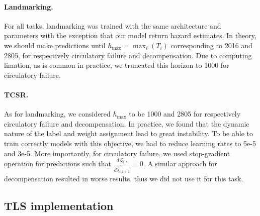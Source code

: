\documentclass[nohyperref]{article}
\begin{document}
\paragraph{Landmarking.} For all tasks, landmarking was trained with the same architecture and parameters with the exception that our model return hazard estimates. In theory, we should make predictions until $h_{\max} = \max_{i}( T_i)$ corresponding to 2016 and 2805, for respectively circulatory failure and decompensation. Due to computing limation, as is common in practice, we truncated this horizon to 1000 for circulatory failure.


\paragraph{TCSR.}
As for landmarking, we considered $h_{\max}$ to be 1000 and 2805 for respectively circulatory failure and decompensation. In practice, we found that the dynamic nature of the label and weight assignment lead to great instability. To be able to train correctly models with this objective, we had to reduce learning rates to 5e-5 and 3e-5. More importantly, for circulatory failure, we used stop-gradient operation for predictions such that $\frac{d\mathcal{L}_{i,t}}{d\hat{\lambda}^h_{i,t+1}} = 0$. A similar approach for decompensation resulted in worse results, thus we did not use it for this task.

\subsection{TLS implementation}
\end{document}
